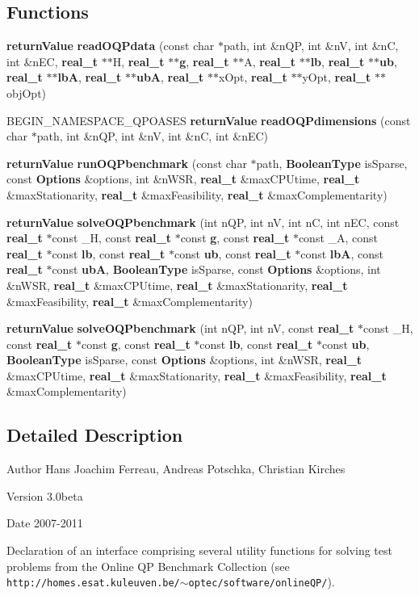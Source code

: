 \subsection*{Functions}
\begin{DoxyCompactItemize}
\item 
{\bf returnValue} {\bf readOQPdata} (const char $\ast$path, int \&nQP, int \&nV, int \&nC, int \&nEC, {\bf real\_\-t} $\ast$$\ast$H, {\bf real\_\-t} $\ast$$\ast${\bf g}, {\bf real\_\-t} $\ast$$\ast$A, {\bf real\_\-t} $\ast$$\ast${\bf lb}, {\bf real\_\-t} $\ast$$\ast${\bf ub}, {\bf real\_\-t} $\ast$$\ast${\bf lbA}, {\bf real\_\-t} $\ast$$\ast${\bf ubA}, {\bf real\_\-t} $\ast$$\ast$xOpt, {\bf real\_\-t} $\ast$$\ast$yOpt, {\bf real\_\-t} $\ast$$\ast$objOpt)
\item 
BEGIN\_\-NAMESPACE\_\-QPOASES {\bf returnValue} {\bf readOQPdimensions} (const char $\ast$path, int \&nQP, int \&nV, int \&nC, int \&nEC)
\item 
{\bf returnValue} {\bf runOQPbenchmark} (const char $\ast$path, {\bf BooleanType} isSparse, const {\bf Options} \&options, int \&nWSR, {\bf real\_\-t} \&maxCPUtime, {\bf real\_\-t} \&maxStationarity, {\bf real\_\-t} \&maxFeasibility, {\bf real\_\-t} \&maxComplementarity)
\item 
{\bf returnValue} {\bf solveOQPbenchmark} (int nQP, int nV, int nC, int nEC, const {\bf real\_\-t} $\ast$const \_\-H, const {\bf real\_\-t} $\ast$const {\bf g}, const {\bf real\_\-t} $\ast$const \_\-A, const {\bf real\_\-t} $\ast$const {\bf lb}, const {\bf real\_\-t} $\ast$const {\bf ub}, const {\bf real\_\-t} $\ast$const {\bf lbA}, const {\bf real\_\-t} $\ast$const {\bf ubA}, {\bf BooleanType} isSparse, const {\bf Options} \&options, int \&nWSR, {\bf real\_\-t} \&maxCPUtime, {\bf real\_\-t} \&maxStationarity, {\bf real\_\-t} \&maxFeasibility, {\bf real\_\-t} \&maxComplementarity)
\item 
{\bf returnValue} {\bf solveOQPbenchmark} (int nQP, int nV, const {\bf real\_\-t} $\ast$const \_\-H, const {\bf real\_\-t} $\ast$const {\bf g}, const {\bf real\_\-t} $\ast$const {\bf lb}, const {\bf real\_\-t} $\ast$const {\bf ub}, {\bf BooleanType} isSparse, const {\bf Options} \&options, int \&nWSR, {\bf real\_\-t} \&maxCPUtime, {\bf real\_\-t} \&maxStationarity, {\bf real\_\-t} \&maxFeasibility, {\bf real\_\-t} \&maxComplementarity)
\end{DoxyCompactItemize}


\subsection{Detailed Description}
\begin{DoxyAuthor}{Author}
Hans Joachim Ferreau, Andreas Potschka, Christian Kirches 
\end{DoxyAuthor}
\begin{DoxyVersion}{Version}
3.0beta 
\end{DoxyVersion}
\begin{DoxyDate}{Date}
2007-\/2011
\end{DoxyDate}
Declaration of an interface comprising several utility functions for solving test problems from the Online QP Benchmark Collection (see {\tt http://homes.esat.kuleuven.be/$\sim$optec/software/onlineQP/}). 

